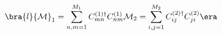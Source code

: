 \begin{equation}
\bra{l}
{\cal M}_{1}= \sum_{n ,m=1}^{M_{1}} 
C_{mn}^{(1)\dag} C_{nm}^{(1)}\\  
{\cal M} _{2 }=
\sum_{i,j=1}^{M_{2}}
C_{ij}^{(2)\dag} C_{ji}^{(2)}
\era
\end{equation}

